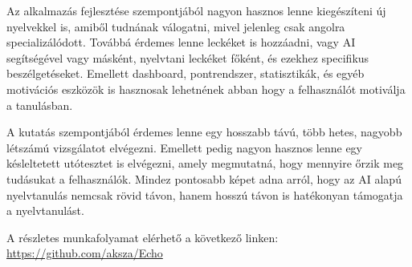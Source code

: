 Az alkalmazás fejlesztése szempontjából nagyon hasznos lenne kiegészíteni új nyelvekkel is, amiből tudnának válogatni, mivel jelenleg csak angolra specializálódott. Továbbá érdemes lenne leckéket is hozzáadni, vagy AI segítségével vagy másként, nyelvtani leckéket főként, és ezekhez specifikus beszélgetéseket. Emellett dashboard, pontrendszer, statisztikák, és egyéb motivációs eszközök is hasznosak lehetnének abban hogy a felhasználót motiválja a tanulásban.

A kutatás szempontjából érdemes lenne egy hosszabb távú, több hetes, nagyobb létszámú vizsgálatot elvégezni. Emellett pedig nagyon hasznos lenne egy késleltetett utótesztet is elvégezni, amely megmutatná, hogy mennyire őrzik meg tudásukat a felhasználók. Mindez pontosabb képet adna arról, hogy az AI alapú nyelvtanulás nemcsak rövid távon, hanem hosszú távon is hatékonyan támogatja a nyelvtanulást.

A részletes munkafolyamat elérhető a következő linken: \url{https://github.com/aksza/Echo}